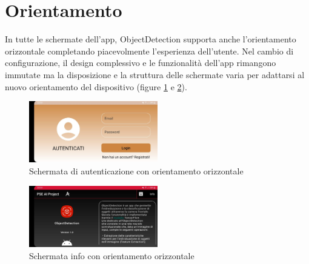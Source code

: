\section{Orientamento}
In tutte le schermate dell’app, ObjectDetection supporta anche l’orientamento orizzontale completando piacevolmente l’esperienza dell’utente.
Nel cambio di configurazione, il design complessivo e le funzionalità dell’app rimangono immutate ma la disposizione e la struttura delle schermate varia
per adattarsi al nuovo orientamento del dispositivo (figure \ref{fig:orizzontale1} e \ref{fig:orizzontale2}).

\begin{figure}[H]
  \centering
  \includegraphics[width=0.5\textwidth]{Immagini/App/login_orizzontale.jpeg}
  \caption{Schermata di autenticazione con orientamento orizzontale}
  \label{fig:orizzontale1}
\end{figure}

\begin{figure}[ht]
  \centering
  \includegraphics[width=0.5\textwidth]{Immagini/App/info_orizzontale.jpeg}
  \caption{Schermata info con orientamento orizzontale}
  \label{fig:orizzontale2}
\end{figure}

